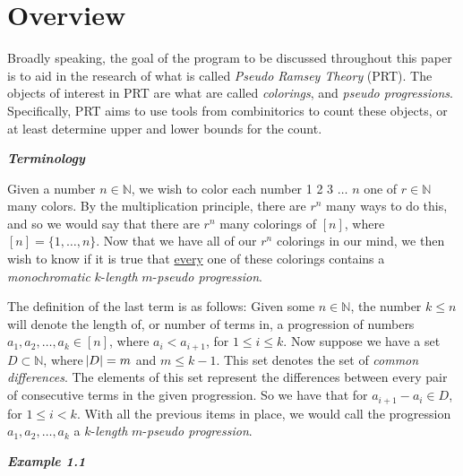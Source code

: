 \documentclass[12pt, a4paper]{article}
\begin{document}
\justifying

\section{Overview}

Broadly speaking, the goal of the program to be discussed throughout this paper is to aid in the research of what is called \textit{Pseudo Ramsey Theory} (PRT). The objects of interest in PRT are what are called \textit{colorings}, and \textit{pseudo progressions}. Specifically, PRT aims to use tools from combinitorics to count these objects, or at least determine upper and lower bounds for the count. \par

\vspace{6mm}

\noindent\textit{\textbf{Terminology}}

\vspace{2mm}
Given a number $n\in\mathbb{N}$, we wish to color each number 1 2 3 $\dots$ $n$ one of $r\in\mathbb{N}$ many colors. By the multiplication principle, there are $r^n$ many ways to do this, and so we would say that there are $r^n$ many colorings of $[n]$, where $[n]=\{1,\dots,n\}$. Now that we have all of our $r^n$ colorings in our mind, we then wish to know if it is true that \underline{every} one of these colorings contains a \textit{monochromatic} $k$-\textit{length} $m$-\textit{pseudo progression}.\par
The definition of the last term is as follows: Given some $n\in\mathbb{N}$, the number $k\leq n$ will denote the length of, or number of terms in, a progression of numbers $a_1,a_2,\dots,a_k\in[n]$, where $a_i<a_{i+1}$, for $1\leq i\leq k$. Now suppose we have a set $D\subset\mathbb{N}$, where $\abs{D}=m$ and $m\leq k-1$. This set denotes the set of \textit{common differences}. The elements of this set represent the differences between every pair of consecutive terms in the given progression. So we have that for $a_{i+1}-a_i\in D$, for $1\leq i< k$. With all the previous items in place, we would call the progression $a_1,a_2,\dots,a_k$ a $k$-\textit{length} $m$-\textit{pseudo progression}.\par

\vspace{6mm}

\noindent\textit{\textbf{Example 1.1}}
\end{document}

